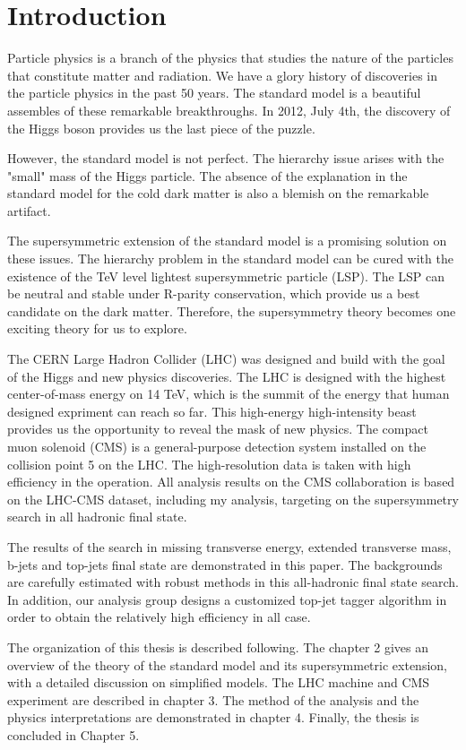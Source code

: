 \chapter{Introduction}
Particle physics is a branch of the physics that studies the nature of the particles that constitute matter and radiation. We have a glory history of discoveries in the particle physics in the past 50 years. The standard model is a beautiful assembles of these remarkable breakthroughs. In 2012, July 4th, the discovery of the Higgs boson provides us the last piece of the puzzle.

However, the standard model is not perfect. The hierarchy issue arises with the "small" mass of the Higgs particle. The absence of the explanation in the standard model for the cold dark matter is also a blemish on the remarkable artifact.

The supersymmetric extension of the standard model is a promising solution on these issues. The hierarchy problem in the standard model can be cured with the existence of the TeV level lightest supersymmetric particle (LSP). The LSP can be neutral and stable under R-parity conservation, which provide us a best candidate on the dark matter. Therefore, the supersymmetry theory becomes one exciting theory for us to explore.

The CERN Large Hadron Collider (LHC) was designed and build with the goal of the Higgs and new physics discoveries. The LHC is designed with the highest center-of-mass energy on 14 TeV, which is the summit of the energy that human designed expriment can reach so far. This high-energy high-intensity beast provides us the opportunity to reveal the mask of new physics. The compact muon solenoid (CMS) is a general-purpose detection system installed on the collision point 5 on the LHC. The high-resolution data is taken with high efficiency in the operation. All analysis results on the CMS collaboration is based on the LHC-CMS dataset, including my analysis, targeting on the supersymmetry search in all hadronic final state.

The results of the search in missing transverse energy, extended transverse mass, b-jets and top-jets final state are demonstrated in this paper. The backgrounds are carefully estimated with robust methods in this all-hadronic final state search. In addition, our analysis group designs a customized top-jet tagger algorithm in order to obtain the relatively high efficiency in all case.

The organization of this thesis is described following. The chapter 2 gives an overview of the theory of the standard model and its supersymmetric extension, with a detailed discussion on simplified models. The LHC machine and CMS experiment are described in chapter 3. The method of the analysis and the physics interpretations are demonstrated in chapter 4. Finally, the thesis is concluded in Chapter 5.
